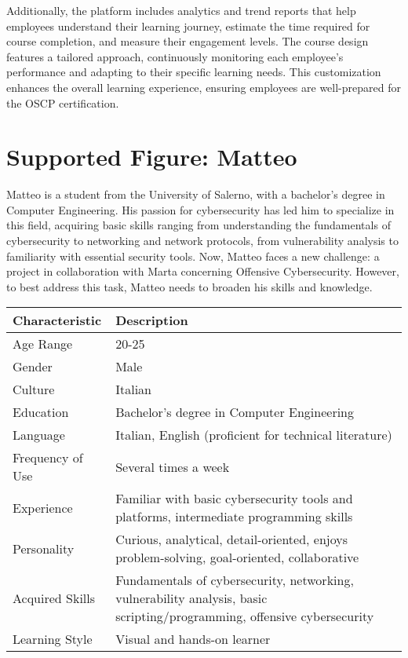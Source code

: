 Additionally, the platform includes analytics and trend reports that help employees understand their learning journey, estimate the time required for course completion, and measure their engagement levels. The course design features a tailored approach, continuously monitoring each employee’s performance and adapting to their specific learning needs. This customization enhances the overall learning experience, ensuring employees are well-prepared for the OSCP certification.

\section{Supported Figure: Matteo}
Matteo is a student from the University of Salerno, with a bachelor's degree in Computer Engineering. His passion for cybersecurity has led him to specialize in this field, acquiring basic skills ranging from understanding the fundamentals of cybersecurity to networking and network protocols, from vulnerability analysis to familiarity with essential security tools. Now, Matteo faces a new challenge: a project in collaboration with Marta concerning Offensive Cybersecurity. However, to best address this task, Matteo needs to broaden his skills and knowledge.

\begin{center}
    \begin{tabular}{|l|p{10cm}|}
    \hline
    \textbf{Characteristic} & \textbf{Description} \\
    \hline
    Age Range & 20-25 \\
    \hline
    Gender & Male \\
    \hline
    Culture & Italian \\
    \hline
    Education & Bachelor's degree in Computer Engineering \\
    \hline
    Language & Italian, English (proficient for technical literature) \\
    \hline
    Frequency of Use & Several times a week \\
    \hline
    Experience & Familiar with basic cybersecurity tools and platforms, intermediate programming skills \\
    \hline
    Personality & Curious, analytical, detail-oriented, enjoys problem-solving, goal-oriented, collaborative \\
    \hline
    Acquired Skills & Fundamentals of cybersecurity, networking, vulnerability analysis, basic scripting/programming, offensive cybersecurity \\
    \hline
    Learning Style & Visual and hands-on learner \\
    \hline
    \end{tabular}
    \end{center}
    
